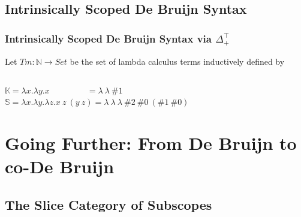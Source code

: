 \documentclass[aspectratio=169]{beamer}
\theoremstyle{remarkstyle}
\begin{document}
\subsection{Intrinsically Scoped De Bruijn Syntax}

\begin{frame}[fragile]
  \frametitle{Intrinsically Scoped De Bruijn Syntax via $Δ_+^⊤$}
  \begin{definition}
    Let $Tm : ℕ → Set$ be the set of lambda calculus terms inductively defined by
    \begin{columns}
      \begin{column}{0.2\textwidth}
        \begin{center}
        \end{center}
      \end{column}
      \begin{column}{0.3\textwidth}
        \begin{center}
        \end{center}
      \end{column}
      \begin{column}{0.3\textwidth}
        \begin{center}
        \end{center}
      \end{column}
    \end{columns}
  \end{definition}
  \begin{example}
    $𝕂 = λx. λy. x \quad \quad \quad \quad \ \ = λ \ λ \ \#1$\\
    $𝕊 = λx. λy. λz. x \ z \ (y \ z) = λ \ λ \ λ \ \#2 \ \#0 \ (\#1 \ \#0)$
  \end{example}
\end{frame}

\section{Going Further: From De Bruijn to co-De Bruijn}
\subsection{The Slice Category of Subscopes}
\end{document}
